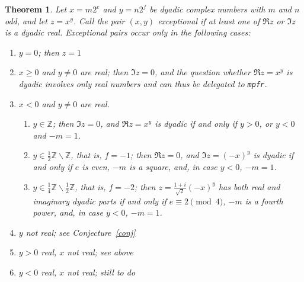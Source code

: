 \documentclass [11pt]{article}
\newcommand {\mpfr}{{\tt mpfr}}
\newcommand {\Z}{\mathbb Z}
\renewcommand {\geq}{\geqslant}
\newtheorem{theorem}{Theorem}
\begin{document}
\begin {theorem}
Let $x = m 2^e$ and $y = n 2^f$ be dyadic complex numbers with $m$ and $n$ odd,
and let $z = x^y$. Call the pair $(x, y)$ {\em exceptional} if at least
one of $\Re z$ or $\Im z$ is a dyadic real. Exceptional pairs occur
only in the following cases:
\begin {enumerate}
\item
$y = 0$; then $z = 1$
\item
$x \geq 0$ and $y \neq 0$ are real; then $\Im z = 0$, and the question
whether $\Re z = x^y$ is dyadic involves only real numbers and
can thus be delegated to \mpfr.
\item
$x < 0$ and $y \neq 0$ are real.
\begin {enumerate}
\item
$y \in \Z$; then $\Im z = 0$, and $\Re z = x^y$ is dyadic if and only if
$y > 0$, or $y < 0$ and $-m = 1$.
\item
$y \in \frac {1}{2} \Z \backslash \Z$, that is, $f = -1$;
then $\Re z = 0$, and $\Im z = (-x)^y$ is dyadic if and only if
$e$ is even, $-m$ is a square, and, in case $y < 0$, $-m = 1$.
\item
$y \in \frac {1}{4} \Z \backslash \frac {1}{2} \Z$, that is, $f = -2$;
then $z = \frac {1 + i}{\sqrt 2} (-x)^y$ has both real and imaginary
dyadic parts if and only if
$e \equiv 2 \pmod 4$, $-m$ is a fourth power, and, in case $y < 0$, $-m = 1$.
\end {enumerate}
\item
$y$ not real;
see Conjecture~\ref {conj}
\item
$y > 0$ real, $x$ not real;
see above
\item
$y < 0$ real, $x$ not real;
still to do
\end {enumerate}
\end {theorem}
\end{document}
